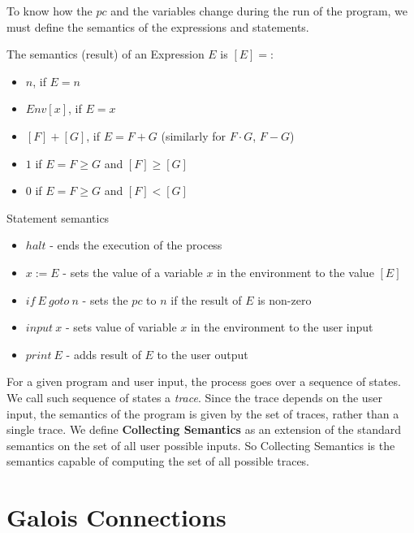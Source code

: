 To know how the $pc$ and the variables change during the run of the program, we must define the semantics of the
expressions and statements.

\begin{defn}
    The semantics (result) of an Expression $E$ is $[E]=$:
    \begin{itemize}
        \item $n$, if $E = n$
        \item $Env[x]$, if $E = x$
        \item $[F] + [G]$, if $E = F + G$ (similarly for $F \cdot G$, $F - G$)
        \item $1$ if $E = F \geq G$ and $[F] \geq [G]$
        \item $0$ if $E = F \geq G$ and $[F] < [G]$
    \end{itemize}
\end{defn}

\begin{defn} Statement semantics
    \begin{itemize}
        \item $halt$ - ends the execution of the process
        \item $x := E$ - sets the value of a variable $x$ in the environment to the value $[E]$
        \item $if \: E \: goto \: n$ - sets the $pc$ to $n$ if the result of $E$ is non-zero
        \item $input \: x$ - sets value of variable $x$ in the environment to the user input
        \item $print \: E$ - adds result of $E$ to the user output
    \end{itemize}
\end{defn}


For a given program and user input, the process goes over a sequence of states.
We call such sequence of states a \textit{trace}.
Since the trace depends on the user input, the semantics of the program is given by the set of traces, rather than
a single trace.
We define \textbf{Collecting Semantics} as an extension of the standard semantics on the set of all user possible inputs.
So Collecting Semantics is the semantics capable of computing the set of all possible traces.


\section{Galois Connections} %

